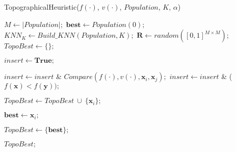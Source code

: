 \begin{breakablealgorithm}
\caption{TopographicalHeuristic($f(\cdot)$, $v(\cdot)$, $Population$, $K$, $\alpha$)}
\label{alg:TopographicalHeuristic}
\begin{spacing}{1.5}
\begin{algorithmic}[1]


\State $M \gets |Population|;$
\State $\bm{best} \gets Population(0);$
\State $KNN_K \gets Build\_KNN(Population, K);$
\State $\bm{R} \gets random([0, 1]^{M \times M});$
\State $TopoBest \gets \{\};$


\State $insert \gets \bm{True};$

		\State $insert \gets insert$ \& $Compare(f(\cdot), v(\cdot), \bm{x}_i, \bm{x}_j);$
	\Else
		\State $insert \gets insert$ \& ($f(\bm{x}) < f(\bm{y}));$
	\EndIf
\EndFor

\State $TopoBest \gets TopoBest \ \cup \ \{\bm{x}_i\};$
\EndIf

\State $\bm{best} \gets \bm{x}_i;$
\EndIf
\EndFor

	\State $TopoBest \gets \{\bm{best}\};$
\EndIf

\State \Return $TopoBest;$



\end{algorithmic}
\end{spacing}
\end{breakablealgorithm}